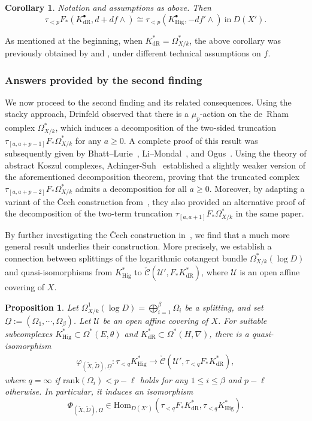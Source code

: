 \documentclass[12pt, a4paper]{article}
\newtheorem{proposition}{Proposition}[section]
\newtheorem{corollary}{Corollary}[section]
\begin{document}
\begin{corollary}\label{intro tau<p structure sheaf}
Notation and assumptions as above. Then
$$
\tau_{<p}F_*(K^\bullet_\mathrm{dR},d+df\wedge)\cong \tau_{<p}(K^\bullet_\mathrm{Hig},-df'\wedge)~\mathrm{in}~D(X').
$$
\end{corollary}
As mentioned at the beginning, when \( K^*_{\mathrm{dR}} = \Omega^*_{X/k} \), the above corollary was previously obtained by \cite{OV} and \cite{ACH}, under different technical assumptions on \( f \). 

\subsubsection{Answers provided by the second finding}
 We now proceed to the second finding and its related consequences. Using the stacky approach, Drinfeld observed that there is a $\mu_p$-action on the de~Rham complex $\Omega^\ast_{X/k}$, which induces a decomposition of the two-sided truncation $\tau_{[a,a+p-1]}F_*\Omega^\ast_{X/k}$ for any $a \geq 0$. A complete proof of this result was subsequently given by Bhatt--Lurie~\cite{BL}, Li--Mondal~\cite{LM}, and Ogus~\cite{O24}. Using the theory of abstract Koszul complexes, Achinger-Suh~\cite{AS} established a slightly weaker version of the aforementioned decomposition theorem, proving that the truncated complex $\tau_{[a,a+p-2]} F_*\Omega^\ast_{X/k}$ admits a decomposition for all $a \geq 0$. Moreover, by adapting a variant of the \v{C}ech construction from~\cite{DI}, they also provided an alternative proof of the decomposition of the two-term truncation $\tau_{[a,a+1]} F_*\Omega^*_{X/k}$ in the same paper.


By further investigating the \v{C}ech construction in~\cite{AS}, we find that a much more general result underlies their construction. More precisely, we establish a connection between splittings of the logarithmic cotangent bundle $\Omega^*_{X/k}(\log D)$ and quasi-isomorphisms from $K^*_\mathrm{Hig}$ to $\check{\mathcal C}(\mathcal U',F_*K^*_\mathrm{dR})$, where $\mathcal U$ is an open affine covering of $X$.

\begin{proposition}\label{intro thm quasi-iso}
Let $\Omega^1_{X/k}(\log D)=\bigoplus_{i=1}^\beta\Omega_i$ be a splitting, and set $\underline\Omega:=(\Omega_1,\cdots,\Omega_\beta)$.
Let $\mathcal U$ be an open affine covering of $X$. For suitable subcomplexes 
$K^*_\mathrm{Hig}\subset\Omega^*(E,\theta)$ and $K^*_\mathrm{dR}\subset\Omega^*(H,\nabla)$, there is a quasi-isomorphism
\begin{eqnarray}\label{intro cech construction omega}
\varphi_{(\tilde X,\tilde D),\underline\Omega}:\tau_{<q}K^*_\mathrm{Hig}\to\check{\mathcal C}(\mathcal U',\tau_{<q}F_*K^*_\mathrm{dR}),
\end{eqnarray}
where $q=\infty$ if $\mathrm{rank}(\Omega_i)<p-\ell$ holds for any $1\leq i\leq\beta$ and $p-\ell$ otherwise. In particular, it induces an isomorphism
$$
\Phi_{(\tilde X,\tilde D),\underline\Omega}\in\mathrm{Hom}_{D(X')}(\tau_{<q}F_*K^*_\mathrm{dR},\tau_{<q}K^*_\mathrm{Hig}).
$$
\end{proposition}
\end{document}
